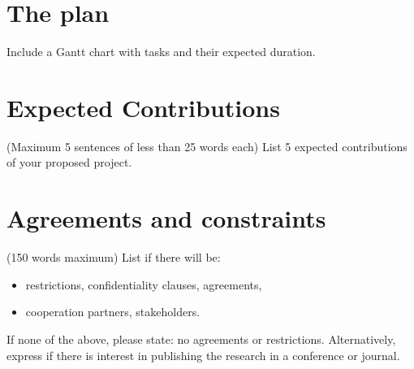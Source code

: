 \documentclass[11pt,a4paper]{article}
\begin{document}
\section{The plan}
Include a Gantt chart with tasks and their expected duration. 

\section{Expected Contributions}
(Maximum 5 sentences of less than 25 words each) List 5 expected contributions of your proposed project.
 
\section{Agreements and constraints}
(150 words maximum) List if there will be: 

\begin{itemize}
\item restrictions, confidentiality clauses, agreements,
\item cooperation partners, stakeholders.
\end{itemize}

If none of the above, please state: no agreements or restrictions. Alternatively, express if there is interest in publishing the research in a conference or journal. 




\end{document}
